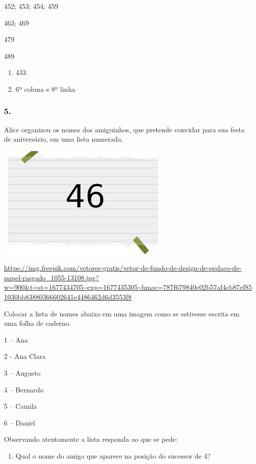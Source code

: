 452; 453; 454; 459

463; 469

479

489

\begin{enumerate}
\def\labelenumi{\alph{enumi})}
\item
  433
\item
  6º coluna e 8º linha
\end{enumerate}

\subsubsection{5.}\label{section-37}

Alice organizou os nomes dos amiguinhos, que pretende convidar para sua
festa de aniversário, em uma lista numerada.

\includegraphics[width=3.30833in,height=2.17391in]{media/image2.png}

\url{https://img.freepik.com/vetores-gratis/vetor-de-fundo-de-design-de-pedaco-de-papel-rasgado_1055-13108.jpg?w=900\&t=st=1677434705~exp=1677435305~hmac=787f679840c02b57af4cb87ef851030bb83880366602641e4486462d6d3553f8}

Colocar a lista de nomes abaixo em uma imagem como se estivesse escrita
em uma folha de caderno.

1 -- Ana

2 - Ana Clara

3 -- Augusto

4 -- Bernardo

5 -- Camila

6 -- Daniel

Observando atentamente a lista responda ao que se pede:

\begin{enumerate}
\def\labelenumi{\alph{enumi})}
\item
  Qual o nome do amigo que aparece na posição do sucessor de 4?
\end{enumerate}

